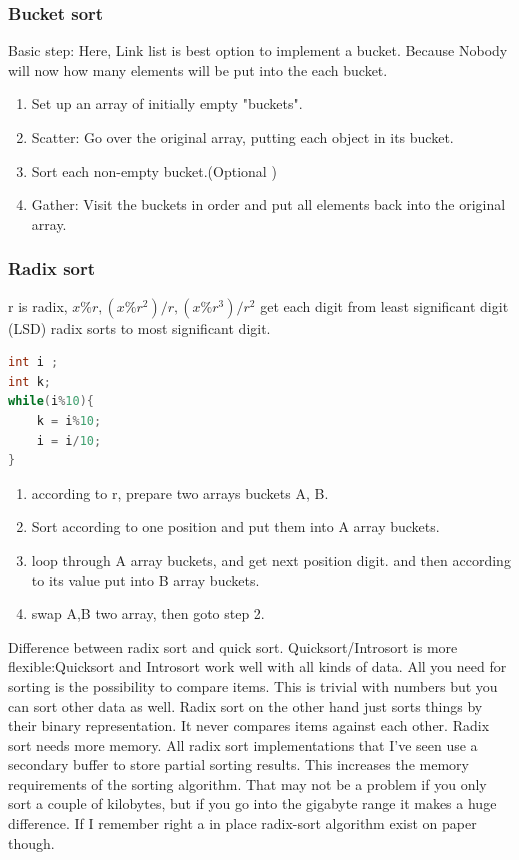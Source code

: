 \documentclass[a4paper,11pt,twoside]{book}
\begin{document}
\subsubsection{Bucket sort}
	
	\par Basic step:  Here, Link list is best option to implement a bucket. Because Nobody will now how many elements will be put into the each bucket. 
	\begin{enumerate}
		\item Set up an array of initially empty "buckets".
		\item Scatter: Go over the original array, putting each object in its bucket. 
		\item Sort each non-empty bucket.(Optional )
		\item Gather: Visit the buckets in order and put all elements back into the original array.
	\end{enumerate}
	


\subsubsection{Radix sort}


	\par r is radix, $x\%r, (x\%r^{2})/r, (x\%r^{3})/r^{2}$  get each digit from least significant digit (LSD) radix sorts to most significant digit. 
	
\begin{lstlisting}[frame=single, language=c++]
int i ;
int k;
while(i%10){
	k = i%10;
	i = i/10;
}	
\end{lstlisting}	
	
	\begin{enumerate}
		\item according to r, prepare two arrays buckets A, B. 
		\item Sort according to one position and put them into A array buckets. 
		\item loop through A array buckets, and get next position digit. and then according to its value put into B array buckets.
		\item swap A,B two array, then goto step 2.
	\end{enumerate}
	
	\par Difference between radix sort and quick sort. Quicksort/Introsort is more flexible:Quicksort and Introsort work well with all kinds of data. All you need for sorting is the possibility to compare items. This is trivial with numbers but you can sort other data as well. Radix sort on the other hand just sorts things by their binary representation. It never compares items against each other. Radix sort needs more memory. All radix sort implementations that I've seen use a secondary buffer to store partial sorting results. This increases the memory requirements of the sorting algorithm. That may not be a problem if you only sort a couple of kilobytes, but if you go into the gigabyte range it makes a huge difference. If I remember right a in place radix-sort algorithm exist on paper though.
	
\end{document}
